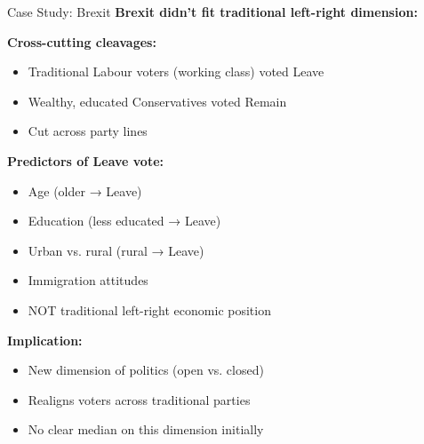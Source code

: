 \documentclass[10pt]{beamer}
\begin{document}
\begin{frame}[allowframebreaks]{Case Study: Brexit}
\textbf{Brexit didn't fit traditional left-right dimension:}



\textbf{Cross-cutting cleavages:}
\begin{itemize}
\item Traditional Labour voters (working class) voted Leave
\item Wealthy, educated Conservatives voted Remain
\item Cut across party lines
\end{itemize}



\textbf{Predictors of Leave vote:}
\begin{itemize}
\item Age (older → Leave)
\item Education (less educated → Leave)
\item Urban vs. rural (rural → Leave)
\item Immigration attitudes
\item \alert{NOT traditional left-right economic position}
\end{itemize}

  \framebreak  

\textbf{Implication:}
\begin{itemize}
\item New dimension of politics (open vs. closed)
\item Realigns voters across traditional parties
\item No clear median on this dimension initially
\end{itemize}
\end{frame}
\end{document}
